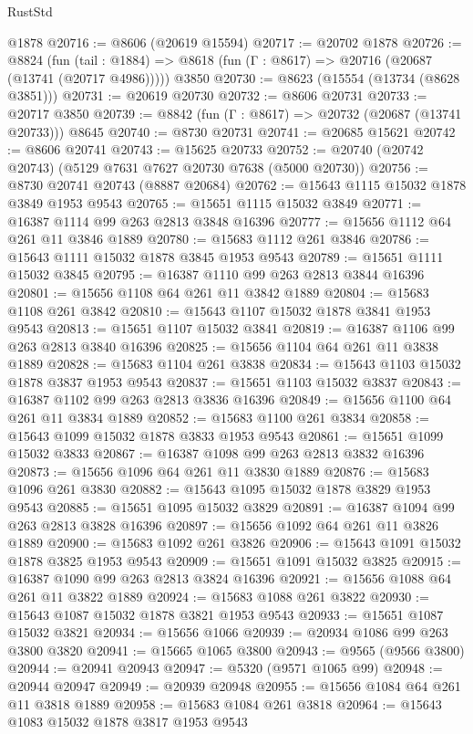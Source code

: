 \begin{lexlean}{RustStd}
\begin{coremodule}
    @1878
@20716 := @8606 (@20619 @15594)
@20717 := @20702 @1878
@20726 := @8824
    (fun (tail : @1884) => @8618 (fun (Γ : @8617) => @20716 (@20687 (@13741 (@20717 @4986)))))
    @3850
@20730 := @8623 (@15554 (@13734 (@8628 @3851)))
@20731 := @20619 @20730
@20732 := @8606 @20731
@20733 := @20717 @3850
@20739 := @8842 (fun (Γ : @8617) => @20732 (@20687 (@13741 @20733))) @8645
@20740 := @8730 @20731
@20741 := @20685 @15621
@20742 := @8606 @20741
@20743 := @15625 @20733
@20752 := @20740 (@20742 @20743) (@5129 @7631 @7627 @20730 @7638 (@5000 @20730))
@20756 := @8730 @20741 @20743 (@8887 @20684)
@20762 := @15643 @1115 @15032 @1878 @3849 @1953 @9543
@20765 := @15651 @1115 @15032 @3849
@20771 := @16387 @1114 @99 @263 @2813 @3848 @16396
@20777 := @15656 @1112 @64 @261 @11 @3846 @1889
@20780 := @15683 @1112 @261 @3846
@20786 := @15643 @1111 @15032 @1878 @3845 @1953 @9543
@20789 := @15651 @1111 @15032 @3845
@20795 := @16387 @1110 @99 @263 @2813 @3844 @16396
@20801 := @15656 @1108 @64 @261 @11 @3842 @1889
@20804 := @15683 @1108 @261 @3842
@20810 := @15643 @1107 @15032 @1878 @3841 @1953 @9543
@20813 := @15651 @1107 @15032 @3841
@20819 := @16387 @1106 @99 @263 @2813 @3840 @16396
@20825 := @15656 @1104 @64 @261 @11 @3838 @1889
@20828 := @15683 @1104 @261 @3838
@20834 := @15643 @1103 @15032 @1878 @3837 @1953 @9543
@20837 := @15651 @1103 @15032 @3837
@20843 := @16387 @1102 @99 @263 @2813 @3836 @16396
@20849 := @15656 @1100 @64 @261 @11 @3834 @1889
@20852 := @15683 @1100 @261 @3834
@20858 := @15643 @1099 @15032 @1878 @3833 @1953 @9543
@20861 := @15651 @1099 @15032 @3833
@20867 := @16387 @1098 @99 @263 @2813 @3832 @16396
@20873 := @15656 @1096 @64 @261 @11 @3830 @1889
@20876 := @15683 @1096 @261 @3830
@20882 := @15643 @1095 @15032 @1878 @3829 @1953 @9543
@20885 := @15651 @1095 @15032 @3829
@20891 := @16387 @1094 @99 @263 @2813 @3828 @16396
@20897 := @15656 @1092 @64 @261 @11 @3826 @1889
@20900 := @15683 @1092 @261 @3826
@20906 := @15643 @1091 @15032 @1878 @3825 @1953 @9543
@20909 := @15651 @1091 @15032 @3825
@20915 := @16387 @1090 @99 @263 @2813 @3824 @16396
@20921 := @15656 @1088 @64 @261 @11 @3822 @1889
@20924 := @15683 @1088 @261 @3822
@20930 := @15643 @1087 @15032 @1878 @3821 @1953 @9543
@20933 := @15651 @1087 @15032 @3821
@20934 := @15656 @1066
@20939 := @20934 @1086 @99 @263 @3800 @3820
@20941 := @15665 @1065 @3800
@20943 := @9565 (@9566 @3800)
@20944 := @20941 @20943
@20947 := @5320 (@9571 @1065 @99)
@20948 := @20944 @20947
@20949 := @20939 @20948
@20955 := @15656 @1084 @64 @261 @11 @3818 @1889
@20958 := @15683 @1084 @261 @3818
@20964 := @15643 @1083 @15032 @1878 @3817 @1953 @9543

\end{coremodule}
\end{lexlean}
